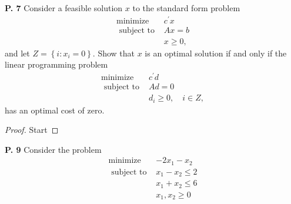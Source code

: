 \documentclass{article}
\begin{document}
\begin{jacklist}
\newpage
    \begin{framed} 
    \item [\textbf{P. 7}] Consider a feasible solution $x$ to the standard form problem 
        \begin{align*}
            \text{minimize} & c^{\prime} x \\
            \text { subject to } & A x=b \\
            & x \geq 0,
        \end{align*}
        and let $Z=\left\{i: x_{i}=0\right\}$. Show that $x$ is an optimal solution if and only if the linear programming problem
        \begin{align*}
            \operatorname{minimize} & c^{\prime} d \\
            \text { subject to } & A d=0 \quad \\
            & d_{i} \geq 0, \quad i \in Z,
        \end{align*}
        has an optimal cost of zero.
    \end{framed}
    \begin{proof}
        Start
    \end{proof}

\newpage
    \begin{framed} 
    \item [\textbf{P. 9}] Consider the problem 
        \[\begin{array}{rc}
            \operatorname{minimize} & -2 x_{1}-x_{2} \\
            \text { subject to } & x_{1}-x_{2} \leq 2 \\
            & x_{1}+x_{2} \leq 6 \\
            & x_{1}, x_{2} \geq 0
        \end{array}\]
    \end{framed}
\end{jacklist}
\end{document}
